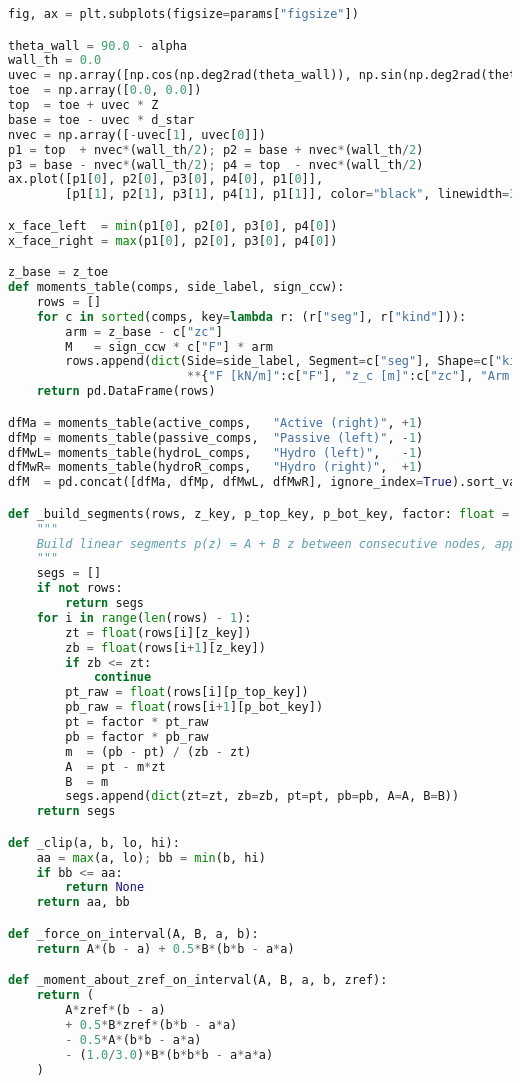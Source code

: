 \begin{lstlisting}[language=Python]
fig, ax = plt.subplots(figsize=params["figsize"])

theta_wall = 90.0 - alpha
wall_th = 0.0
uvec = np.array([np.cos(np.deg2rad(theta_wall)), np.sin(np.deg2rad(theta_wall))])
toe  = np.array([0.0, 0.0])
top  = toe + uvec * Z
base = toe - uvec * d_star
nvec = np.array([-uvec[1], uvec[0]])
p1 = top  + nvec*(wall_th/2); p2 = base + nvec*(wall_th/2)
p3 = base - nvec*(wall_th/2); p4 = top  - nvec*(wall_th/2)
ax.plot([p1[0], p2[0], p3[0], p4[0], p1[0]],
        [p1[1], p2[1], p3[1], p4[1], p1[1]], color="black", linewidth=3)

x_face_left  = min(p1[0], p2[0], p3[0], p4[0])
x_face_right = max(p1[0], p2[0], p3[0], p4[0])

z_base = z_toe
def moments_table(comps, side_label, sign_ccw):
    rows = []
    for c in sorted(comps, key=lambda r: (r["seg"], r["kind"])):
        arm = z_base - c["zc"]
        M   = sign_ccw * c["F"] * arm
        rows.append(dict(Side=side_label, Segment=c["seg"], Shape=c["kind"],
                         **{"F [kN/m]":c["F"], "z_c [m]":c["zc"], "Arm to base [m]":arm, "M_base [kN·m/m]":M}))
    return pd.DataFrame(rows)

dfMa = moments_table(active_comps,   "Active (right)", +1)
dfMp = moments_table(passive_comps,  "Passive (left)", -1)
dfMwL= moments_table(hydroL_comps,   "Hydro (left)",   -1)
dfMwR= moments_table(hydroR_comps,   "Hydro (right)",  +1)
dfM  = pd.concat([dfMa, dfMp, dfMwL, dfMwR], ignore_index=True).sort_values(["Side","Segment","Shape"])

def _build_segments(rows, z_key, p_top_key, p_bot_key, factor: float = 1.0):
    """
    Build linear segments p(z) = A + B z between consecutive nodes, applying factor to pressures.
    """
    segs = []
    if not rows:
        return segs
    for i in range(len(rows) - 1):
        zt = float(rows[i][z_key])
        zb = float(rows[i+1][z_key])
        if zb <= zt:
            continue
        pt_raw = float(rows[i][p_top_key])
        pb_raw = float(rows[i+1][p_bot_key])
        pt = factor * pt_raw
        pb = factor * pb_raw
        m  = (pb - pt) / (zb - zt)
        A  = pt - m*zt
        B  = m
        segs.append(dict(zt=zt, zb=zb, pt=pt, pb=pb, A=A, B=B))
    return segs

def _clip(a, b, lo, hi):
    aa = max(a, lo); bb = min(b, hi)
    if bb <= aa:
        return None
    return aa, bb

def _force_on_interval(A, B, a, b):
    return A*(b - a) + 0.5*B*(b*b - a*a)

def _moment_about_zref_on_interval(A, B, a, b, zref):
    return (
        A*zref*(b - a)
        + 0.5*B*zref*(b*b - a*a)
        - 0.5*A*(b*b - a*a)
        - (1.0/3.0)*B*(b*b*b - a*a*a)
    )


\end{lstlisting}
